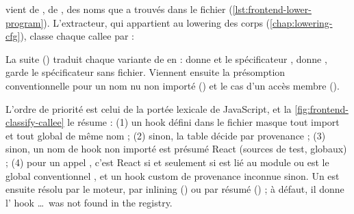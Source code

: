 
 vient de ,  de ,  des noms que  a trouvés dans le fichier (\cref{lst:frontend-lower-program}). L'extracteur, qui appartient au lowering des corps (\cref{chap:lowering-cfg}), classe chaque callee par  :


\noindent La suite () traduit chaque variante de  en  :  donne  et le spécificateur ,  donne ,  garde le spécificateur sans fichier. Viennent ensuite la présomption conventionnelle pour un nom nu non importé () et le cas d'un accès membre  ().

L'ordre de priorité est celui de la portée lexicale de JavaScript, et la \cref{fig:frontend-classify-callee} le résume : (1) un hook défini dans le fichier masque tout import et tout global de même nom ; (2) sinon, la table  décide par provenance ; (3) sinon, un nom de hook non importé est présumé React (sources de test, globaux) ; (4) pour un appel , c'est React si et seulement si  est lié au module  ou est le global conventionnel , et un hook custom de provenance inconnue sinon. Un  est ensuite résolu par le moteur, par inlining () ou par résumé () ; à défaut, il donne l'\Info{} \og hook \dots\ was not found in the registry\fg{}.

